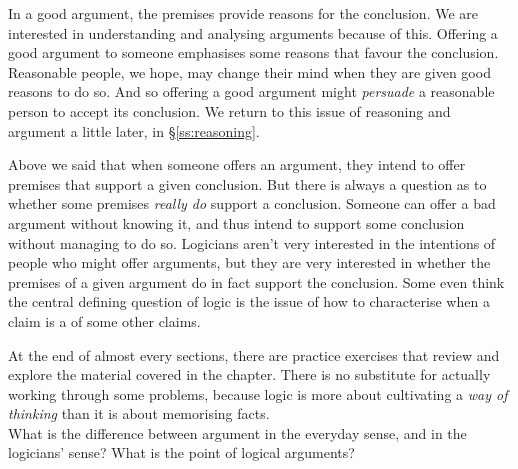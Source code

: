 In a good argument, the premises provide reasons for the conclusion. We are interested in understanding and analysing arguments because of this. Offering a good argument to someone emphasises some reasons that favour the conclusion. Reasonable people, we hope, may change their mind when they are given good reasons to do so. And so offering a good argument might \emph{persuade} a reasonable person to accept its conclusion. We return to this issue of reasoning and argument a little later, in §\ref{ss:reasoning}.

Above we said that when someone offers an argument, they intend to offer premises that support a given conclusion. But there is always a question as to whether some premises \emph{really do} support a conclusion. Someone can offer a bad argument without knowing it, and thus intend to support some conclusion without managing to do so. Logicians aren't very interested in the intentions of people who might offer arguments, but they are very interested in whether the premises of a given argument do in fact support the conclusion. Some even think the central defining question of logic is the issue of how to characterise when a claim is a  of some other claims.




\practiceproblems
At the end of almost every sections, there are practice exercises that review and explore the material covered in the chapter. There is no substitute for actually working through some problems, because logic is more about cultivating a \emph{way of thinking} than it is about memorising facts.\\[12pt]

\problempart What is the difference between argument in the everyday sense, and in the logicians’ sense? What is the point of logical arguments?

